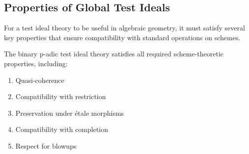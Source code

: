 \subsection{Properties of Global Test Ideals}

For a test ideal theory to be useful in algebraic geometry, it must satisfy several key properties that ensure compatibility with standard operations on schemes.

\begin{theorem}\label{thm:scheme-properties}
The binary p-adic test ideal theory satisfies all required scheme-theoretic properties, including:
\begin{enumerate}
    \item Quasi-coherence
    \item Compatibility with restriction
    \item Preservation under étale morphisms
    \item Compatibility with completion
    \item Respect for blowups
\end{enumerate}
\end{theorem}

